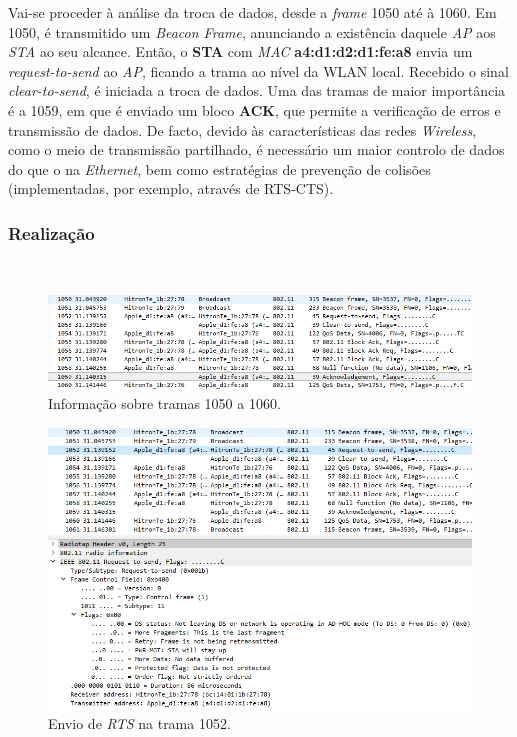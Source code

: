 \documentclass{llncs}
\begin{document}
Vai-se proceder à análise da troca de dados, desde a \textit{frame} 1050 até à 1060.
Em 1050, é transmitido um \textit{Beacon Frame}, anunciando a existência daquele \textit{AP} aos \textit{STA} ao seu alcance. Então, o \textbf{STA} com \textit{MAC} \textbf{a4:d1:d2:d1:fe:a8} envia um \textit{request-to-send} ao \textit{AP}, ficando a trama ao nível da WLAN local. Recebido o sinal \textit{clear-to-send}, é iniciada a troca de dados.
Uma das tramas de maior importância é a 1059, em que é enviado um bloco \textbf{ACK}, que permite a verificação de erros e transmissão de dados. De facto, devido às características das redes \textit{Wireless}, como o meio de transmissão partilhado, é necessário um maior controlo de dados do que o na \textit{Ethernet}, bem como estratégias de prevenção de colisões (implementadas, por exemplo, através de RTS-CTS).

\subsubsection{Realização}\rule[-10pt]{0pt}{10pt}\\

\begin{figure}
  \begin{center}
  \includegraphics[scale=0.6]{./imagens/p17tramas.png} 
  \end{center}
  \caption{Informação sobre tramas 1050 a 1060.}
  \label{fig:control_frame}
\end{figure}

\begin{figure}
  \begin{center}
  \includegraphics[scale=0.6]{./imagens/p17rts.png} 
  \end{center}
  \caption{Envio de \textit{RTS} na trama 1052.}
  \label{fig:control_frame}
\end{figure}
\end{document}
